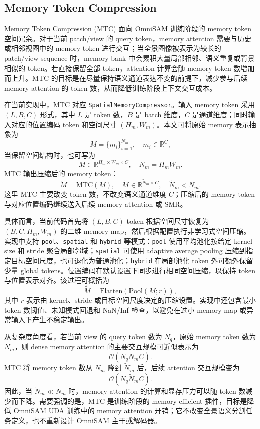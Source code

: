 \subsection{Memory Token Compression}
Memory Token Compression (MTC) 面向 OmniSAM 训练阶段的 memory token 空间冗余。对于当前 patch/view 的 query token，memory attention 需要与历史或相邻视图中的 memory token 进行交互；当全景图像被表示为较长的 patch/view sequence 时，memory bank 中会累积大量局部相邻、语义重复或背景相似的 token。若直接保留全部 token，attention 计算会随 memory token 数增加而上升。MTC 的目标是在尽量保持语义通道表达不变的前提下，减少参与后续 memory attention 的 token 数，从而降低训练阶段上下文交互成本。

在当前实现中，MTC 对应 \texttt{SpatialMemoryCompressor}。输入 memory token 采用 $(L,B,C)$ 形式，其中 $L$ 是 token 数，$B$ 是 batch 维度，$C$ 是通道维度；同时输入对应的位置编码 token 和空间尺寸 $(H_m,W_m)$。本文可将原始 memory 表示抽象为
\[
M = \{m_i\}_{i=1}^{N_m}, \quad m_i \in \mathbb{R}^{C},
\]
当保留空间结构时，也可写为
\[
M \in \mathbb{R}^{H_m \times W_m \times C}, \quad N_m = H_m W_m.
\]
MTC 输出压缩后的 memory token：
\[
\tilde{M} = \mathrm{MTC}(M), \quad \tilde{M} \in \mathbb{R}^{\tilde{N}_m \times C}, \quad \tilde{N}_m < N_m.
\]
这里 MTC 主要改变 token 数，不改变语义通道维度 $C$；压缩后的 memory token 与对应位置编码继续送入后续 memory attention 或 SMR。

具体而言，当前代码首先将 $(L,B,C)$ token 根据空间尺寸恢复为 $(B,C,H_m,W_m)$ 的二维 memory map，然后根据配置执行非学习式空间压缩。实现中支持 \texttt{pool}、\texttt{spatial} 和 \texttt{hybrid} 等模式：\texttt{pool} 使用平均池化按给定 kernel size 和 stride 聚合局部邻域；\texttt{spatial} 可使用 adaptive average pooling 压缩到指定目标空间尺度，也可退化为普通池化；\texttt{hybrid} 在局部池化 token 外可额外保留少量 global tokens。位置编码在默认设置下同步进行相同空间压缩，以保持 token 与位置表示对齐。该过程可概括为
\[
\tilde{M} = \mathrm{Flatten}(\mathrm{Pool}(M; r)),
\]
其中 $r$ 表示由 kernel、stride 或目标空间尺度决定的压缩设置。实现中还包含最小 token 数阈值、未知模式回退和 NaN/Inf 检查，以避免在过小 memory map 或异常输入下产生不稳定输出。

从复杂度角度看，若当前 view 的 query token 数为 $N_q$，原始 memory token 数为 $N_m$，则 dense memory attention 的主要交互规模可近似表示为
\[
\mathcal{O}(N_q N_m C).
\]
MTC 将 memory token 数从 $N_m$ 降到 $\tilde{N}_m$ 后，后续 attention 交互规模变为
\[
\mathcal{O}(N_q \tilde{N}_m C).
\]
因此，当 $\tilde{N}_m \ll N_m$ 时，memory attention 的计算和显存压力可以随 token 数减少而下降。需要强调的是，MTC 是训练阶段的 memory-efficient 插件，目标是降低 OmniSAM UDA 训练中的 memory attention 开销；它不改变全景语义分割任务定义，也不重新设计 OmniSAM 主干或解码器。

